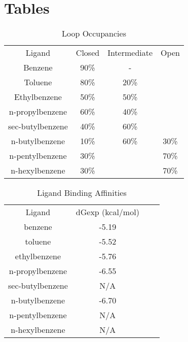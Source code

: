 \documentclass[journal=jctcce,manuscript=article]{achemso}
\begin{document}
\section{Tables}
\begin{table}
  \caption{Loop Occupancies \cite{Merski2015}}
  \label{tbl:loopocc}
  \begin{tabular}{|c|c|c|c|}
  \hline
  Ligand           & Closed & Intermediate & Open  \\
  Benzene          & 90\%   & -            &       \\
  Toluene          & 80\%   & 20\%         &       \\
  Ethylbenzene     & 50\%   & 50\%         &       \\
  n-propylbenzene  & 60\%   & 40\%         &       \\
  sec-butylbenzene & 40\%   & 60\%         &       \\
  n-butylbenzene   & 10\%   & 60\%         & 30\%  \\
  n-pentylbenzene  & 30\%   &              & 70\%  \\
  n-hexylbenzene   & 30\%   &              & 70\%  \\
  \hline
  \end{tabular}
\end{table}

\begin{table}
   \caption{Ligand Binding Affinities}
   \label{tbl:ligaff}
   \begin{tabular}{|c|c|c|c|}
   \hline
   Ligand           & dGexp (kcal/mol) \\
   benzene          & -5.19            \\
   toluene          & -5.52            \\
   ethylbenzene     & -5.76            \\
   n-propylbenzene  & -6.55            \\
   sec-butylbenzene & N/A              \\
   n-butylbenzene   & -6.70            \\
   n-pentylbenzene  & N/A              \\
   n-hexylbenzene   & N/A              \\
   \hline
   \end{tabular}
\end{table}



\end{document}

